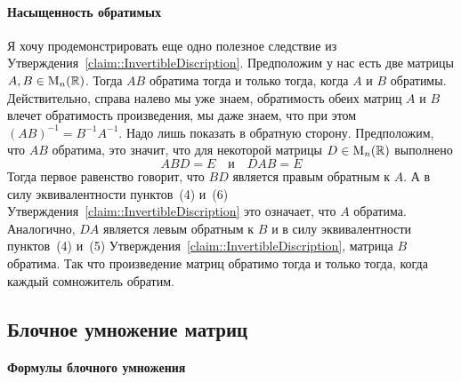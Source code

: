 \paragraph{Насыщенность обратимых}

Я хочу продемонстрировать еще одно полезное следствие из Утверждения~\ref{claim::InvertibleDiscription}.
Предположим у нас есть две матрицы $A, B\in \operatorname{M}_{n}(\mathbb R)$.
Тогда $AB$ обратима тогда и только тогда, когда $A$ и $B$ обратимы.
Действительно, справа налево мы уже знаем, обратимость обеих матриц $A$ и $B$ влечет обратимость произведения, мы даже знаем, что при этом $(AB)^{-1} = B^{-1}A^{-1}$.
Надо лишь показать в обратную сторону.
Предположим, что $AB$ обратима, это значит, что для некоторой матрицы $D\in \operatorname{M}_{n}(\mathbb R)$ выполнено
\[
ABD = E\quad\text{и}\quad DAB = E
\]
Тогда первое равенство говорит, что $BD$ является правым обратным к $A$.
А в силу эквивалентности пунктов~(4) и~(6) Утверждения~\ref{claim::InvertibleDiscription} это означает, что $A$ обратима.
Аналогично, $DA$ является левым обратным к $B$ и в силу эквивалентности пунктов~(4) и~(5) Утверждения~\ref{claim::InvertibleDiscription}, матрица $B$ обратима.
Так что произведение матриц обратимо тогда и только тогда, когда каждый сомножитель обратим.

\subsection{Блочное умножение матриц}
\label{section::BlockMult}

\paragraph{Формулы блочного умножения}

